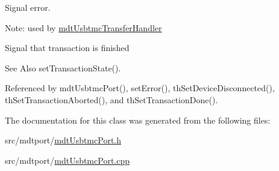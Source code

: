 Signal error. 

Note\-: used by \hyperlink{classmdt_usbtmc_transfer_handler}{mdt\-Usbtmc\-Transfer\-Handler}

Signal that transaction is finished \begin{DoxySeeAlso}{See Also}
set\-Transaction\-State(). 
\end{DoxySeeAlso}


Referenced by mdt\-Usbtmc\-Port(), set\-Error(), th\-Set\-Device\-Disconnected(), th\-Set\-Transaction\-Aborted(), and th\-Set\-Transaction\-Done().



The documentation for this class was generated from the following files\-:\begin{DoxyCompactItemize}
\item 
src/mdtport/\hyperlink{mdt_usbtmc_port_8h}{mdt\-Usbtmc\-Port.\-h}\item 
src/mdtport/\hyperlink{mdt_usbtmc_port_8cpp}{mdt\-Usbtmc\-Port.\-cpp}\end{DoxyCompactItemize}
